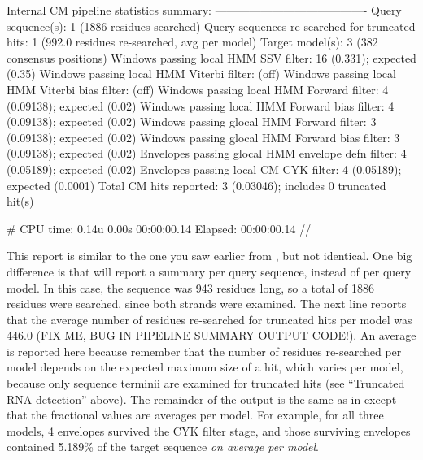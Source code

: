 \begin{sreoutput}
Internal CM pipeline statistics summary:
----------------------------------------
Query sequence(s):                                               1  (1886 residues searched)
Query sequences re-searched for truncated hits:                  1  (992.0 residues re-searched, avg per model)
Target model(s):                                                 3  (382 consensus positions)
Windows   passing  local HMM SSV           filter:              16  (0.331); expected (0.35)
Windows   passing  local HMM Viterbi       filter:                  (off)
Windows   passing  local HMM Viterbi  bias filter:                  (off)
Windows   passing  local HMM Forward       filter:               4  (0.09138); expected (0.02)
Windows   passing  local HMM Forward  bias filter:               4  (0.09138); expected (0.02)
Windows   passing glocal HMM Forward       filter:               3  (0.09138); expected (0.02)
Windows   passing glocal HMM Forward  bias filter:               3  (0.09138); expected (0.02)
Envelopes passing glocal HMM envelope defn filter:               4  (0.05189); expected (0.02)
Envelopes passing  local CM  CYK           filter:               4  (0.05189); expected (0.0001)
Total CM hits reported:                                          3  (0.03046); includes 0 truncated hit(s)

# CPU time: 0.14u 0.00s 00:00:00.14 Elapsed: 00:00:00.14
//
\end{sreoutput}

This report is similar to the one you saw earlier from
, but not identical. One big difference is that
 will report a summary per query sequence, instead of per
query model. In this case, the sequence was 943 residues long, so a
total of 1886 residues were searched, since both strands were
examined. The next line reports that the average number of residues
re-searched for truncated hits per model was 446.0 (FIX ME, BUG IN
PIPELINE SUMMARY OUTPUT CODE!). An average is reported here because
remember that the number of residues re-searched per model depends on
the expected maximum size of a hit, which varies per model, because
only sequence terminii are examined for truncated hits (see
``Truncated RNA detection'' above).  The remainder of the output is
the same as in  except that the fractional values are
averages per model. For example, for all three models, 4 envelopes
survived the CYK filter stage, and those surviving envelopes contained
5.189\% of the target sequence \emph{on average per model}.

